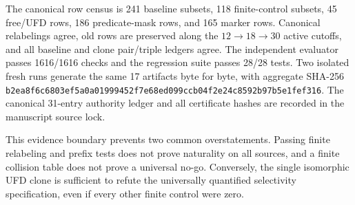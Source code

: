 The canonical row census is 241 baseline subsets, 118 finite-control
subsets, 45 free/UFD rows, 186 predicate-mask rows, and 165 marker rows.
Canonical relabelings agree, old rows are preserved along the
\(12\to18\to30\) active cutoffs, and all baseline and clone pair/triple
ledgers agree.  The independent evaluator passes 1616/1616 checks and the
regression suite passes 28/28 tests.  Two isolated fresh runs generate the
same 17 artifacts byte for byte, with aggregate SHA-256
\texttt{b2ea8f6c6803ef5a0a01999452f7e68ed099ccb04f2e24c8592b97b5e1fef316}.
The canonical 31-entry authority ledger and all certificate hashes are
recorded in the manuscript source lock.

This evidence boundary prevents two common overstatements.  Passing finite
relabeling and prefix tests does not prove naturality on all sources, and a
finite collision table does not prove a universal no-go.  Conversely, the
single isomorphic UFD clone is sufficient to refute the universally
quantified selectivity specification, even if every other finite control
were zero.
